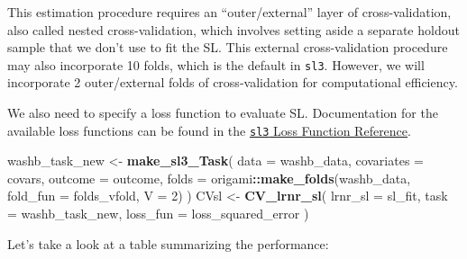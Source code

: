 \documentclass[12pt, krantz2,]{krantz}
\newenvironment{Shaded}{\begin{snugshade}}{\end{snugshade}}
\newcommand{\ControlFlowTok}[1]{\textcolor[rgb]{0.27,0.27,0.27}{\textbf{#1}}}
\newcommand{\DataTypeTok}[1]{\textcolor[rgb]{0.27,0.27,0.27}{#1}}
\newcommand{\DecValTok}[1]{\textcolor[rgb]{0.06,0.06,0.06}{#1}}
\newcommand{\KeywordTok}[1]{\textcolor[rgb]{0.27,0.27,0.27}{\textbf{#1}}}
\newcommand{\NormalTok}[1]{#1}
\newcommand{\OperatorTok}[1]{\textcolor[rgb]{0.43,0.43,0.43}{\textbf{#1}}}
\newcommand{\OtherTok}[1]{\textcolor[rgb]{0.37,0.37,0.37}{#1}}
\newcommand{\StringTok}[1]{\textcolor[rgb]{0.5,0.5,0.5}{#1}}
\theoremstyle{definition}
\theoremstyle{definition}
\theoremstyle{definition}
\newcommand{\1}{\mathbbm{1}}
\begin{document}
This estimation procedure requires an ``outer/external'' layer of
cross-validation, also called nested cross-validation, which involves setting
aside a separate holdout sample that we don't use to fit the SL. This external
cross-validation procedure may also incorporate 10 folds, which is the default
in \texttt{sl3}. However, we will incorporate 2 outer/external folds of
cross-validation for computational efficiency.

We also need to specify a loss function to evaluate SL. Documentation for the
available loss functions can be found in the \href{https://tlverse.org/sl3/reference/loss_functions.html}{\texttt{sl3} Loss
Function Reference}.

\begin{Shaded}
\begin{Highlighting}[]
\NormalTok{washb_task_new <-}\StringTok{ }\KeywordTok{make_sl3_Task}\NormalTok{(}
  \DataTypeTok{data =}\NormalTok{ washb_data,}
  \DataTypeTok{covariates =}\NormalTok{ covars,}
  \DataTypeTok{outcome =}\NormalTok{ outcome,}
  \DataTypeTok{folds =}\NormalTok{ origami}\OperatorTok{::}\KeywordTok{make_folds}\NormalTok{(washb_data, }\DataTypeTok{fold_fun =}\NormalTok{ folds_vfold, }\DataTypeTok{V =} \DecValTok{2}\NormalTok{)}
\NormalTok{)}
\NormalTok{CVsl <-}\StringTok{ }\KeywordTok{CV_lrnr_sl}\NormalTok{(}
  \DataTypeTok{lrnr_sl =}\NormalTok{ sl_fit, }\DataTypeTok{task =}\NormalTok{ washb_task_new, }\DataTypeTok{loss_fun =}\NormalTok{ loss_squared_error}
\NormalTok{)}
\end{Highlighting}
\end{Shaded}

Let's take a look at a table summarizing the performance:

\begin{Shaded}
\end{Shaded}
\end{document}
